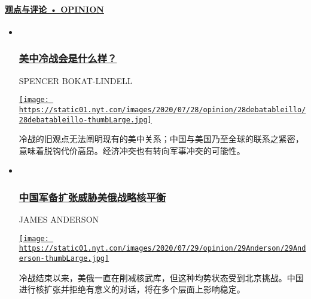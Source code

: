 \hypertarget{ux89c2ux70b9ux4e0eux8bc4ux8bba--opinion}{%
\paragraph{\texorpdfstring{\href{/opinion}{观点与评论 •
OPINION}}{观点与评论 • OPINION}}\label{ux89c2ux70b9ux4e0eux8bc4ux8bba--opinion}}

\begin{itemize}
\item ~
  \hypertarget{ux7f8eux4e2dux51b7ux6218ux4f1aux662fux4ec0ux4e48ux6837}{%
  \subsubsection{\texorpdfstring{\href{/opinion/20200730/trump-china/}{美中冷战会是什么样？}}{美中冷战会是什么样？}}\label{ux7f8eux4e2dux51b7ux6218ux4f1aux662fux4ec0ux4e48ux6837}}

  SPENCER BOKAT-LINDELL

  \href{/opinion/20200730/trump-china/}{\texttt{[image: https://static01.nyt.com/images/2020/07/28/opinion/28debatableillo/28debatableillo-thumbLarge.jpg]}}

  冷战的旧观点无法阐明现有的美中关系；中国与美国乃至全球的联系之紧密，意味着脱钩代价高昂。经济冲突也有转向军事冲突的可能性。
\item ~
  \hypertarget{ux4e2dux56fdux519bux5907ux6269ux5f20ux5a01ux80c1ux7f8eux4fc4ux6218ux7565ux6838ux5e73ux8861}{%
  \subsubsection{\texorpdfstring{\href{/opinion/20200730/russia-china-nuclear-weapons/}{中国军备扩张威胁美俄战略核平衡}}{中国军备扩张威胁美俄战略核平衡}}\label{ux4e2dux56fdux519bux5907ux6269ux5f20ux5a01ux80c1ux7f8eux4fc4ux6218ux7565ux6838ux5e73ux8861}}

  JAMES ANDERSON

  \href{/opinion/20200730/russia-china-nuclear-weapons/}{\texttt{[image: https://static01.nyt.com/images/2020/07/29/opinion/29Anderson/29Anderson-thumbLarge.jpg]}}

  冷战结束以来，美俄一直在削减核武库，但这种均势状态受到北京挑战。中国进行核扩张并拒绝有意义的对话，将在多个层面上影响稳定。
\end{itemize}

